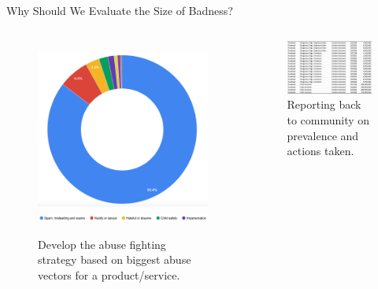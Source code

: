 \documentclass[nobackground,dvipsnames,table]{beamer}
\begin{document}
\begin{frame}{Why Should We Evaluate the Size of Badness?}
    \begin{columns}[T]
            \begin{figure}
                \centering
                \caption{Develop the abuse fighting strategy based on biggest abuse vectors for a product/service.}
                \includegraphics[width=\textwidth]{abuse-vectors}
                \includegraphics[width=1.25\textwidth]{abuse-vectors-key}
            \end{figure}
            \begin{figure}
                \centering
                \caption{Reporting back to community on prevalence and actions taken.}
                \includegraphics[width=\textwidth]{facebook-community-reports}
            \end{figure}
    \end{columns}
\end{frame}
\end{document}

